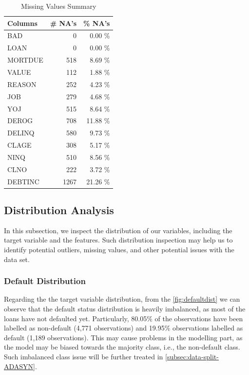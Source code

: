\begin{table}[H]
\small
\setlength{\tabcolsep}{8pt}
\renewcommand{\arraystretch}{1.3}
\centering
\caption[Missing Values Summary]{Missing Values Summary}\label{tab:natable}
\begin{tabular}{l r r}
\toprule
\textbf{Columns} & \textbf{\# NA's} & \textbf{\% NA's}\\
\midrule
\hline
BAD & 0 & 0.00 \% \\
LOAN & 0 & 0.00 \% \\
MORTDUE & 518 & 8.69 \% \\
VALUE & 112 & 1.88 \% \\
REASON & 252 & 4.23 \% \\
JOB & 279 & 4.68 \% \\
YOJ & 515 & 8.64 \% \\
DEROG & 708 & 11.88 \% \\
DELINQ & 580 & 9.73 \% \\
CLAGE & 308 & 5.17 \% \\
NINQ & 510 & 8.56 \% \\
CLNO & 222 & 3.72 \% \\
DEBTINC & 1267 & 21.26 \% \\
\hline
\bottomrule
\end{tabular}
\vspace{0.35em}

\vspace{-1em}
\end{table}


\subsection{Distribution Analysis}
\label{subsec:distribution}
In this subsection, we inspect the distribution of our variables, including the target variable and the features.
Such distribution inspection may help us to identify potential outliers, missing values, and other potential issues with the data set.

\subsubsection{Default Distribution}

Regarding the the target variable distribution, from the \autoref{fig:defaultdist} we can observe that the default status distribution is heavily imbalanced, as most of the loans have not defaulted yet.
Particularly, 80.05\% of the observations have been labelled as non-default (4,771 observations) and 19.95\% observations labelled as default (1,189 observations).
This may cause problems in the modelling part, as the model may be biased towards the majority class, i.e., the non-default class. Such imbalanced class issue will be further treated in \autoref{subsec:data-split-ADASYN}.

